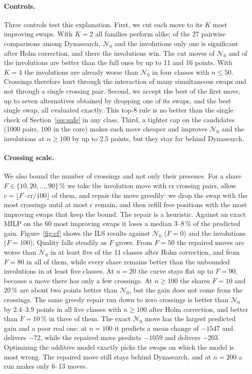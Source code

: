 \documentclass{article}
\newcommand{\N}{\mathcal{N}}
\begin{document}
\paragraph{Controls.} Three controls test this explanation. First, we
cut each move to its $K$ most improving swaps. With $K=2$ all families
perform alike: of the 27 pairwise comparisons among Dynasearch, $\N_0$
and the involutions only one is significant after Holm correction, and
there the involutions win. The cut moves of $\N_0$ and of the
involutions are better than the full ones by up to 11 and 16 points.
With $K=4$ the involutions are already worse than $\N_0$ in four
classes with $n\leq50$. Crossings therefore hurt through the
interaction of many simultaneous swaps and not through a single crossing
pair. Second, we accept the best of the first move, up to seven
alternatives obtained by dropping one of its swaps, and the best single
swap, all evaluated exactly. This top-8 rule is no better than the
single check of Section~\ref{sec:safe} in any class. Third, a tighter cap
on the candidates (1000 pairs, 100 in the core) makes each move cheaper
and improves $\N_0$ and the involutions at $n\geq100$ by up to $2.5$
points, but they stay far behind Dynasearch.

\paragraph{Crossing scale.} We also bound the number of crossings and
not only their presence. For a share $F\in\{10,20,\dots,90\}\,\%$ we take
the involution move with cr crossing pairs, allow
$c=\lfloor F\cdot\mathrm{cr}/100\rfloor$ of them, and repair the move
greedily: we drop the swap with the most crossings until at most $c$
remain, and then refill free positions with the most improving swaps
that keep the bound. The repair is a heuristic. Against an exact MILP on
the 60 most improving swaps it loses a median 3--8\,\% of the predicted
gain. Figure~\ref{fig:cf} shows the ILS results against $\N_0$ ($F=0$)
and the involutions ($F=100$). Quality falls steadily as $F$ grows. From
$F=50$ the repaired moves are worse than $\N_0$ in at least five of the
11 classes after Holm correction, and from $F=80$ in all of them, while
every share remains better than the unbounded involutions in at least
five classes. At $n=20$ the curve stays flat up to $F=90$, because a
move there has only a few crossings. At $n\geq100$ the shares $F=10$ and $20\,\%$ are about two points better
than $\N_0$, but the gain does not come from the crossings. The same
greedy repair run down to zero crossings is better than $\N_0$ by
2.4--3.9 points in all five classes with $n\geq100$ after Holm
correction, and better than $F=10\,\%$ in three of them. The exact $\N_0$
move has the largest predicted gain and a poor real one: at $n=100$ it
predicts a mean change of $-1547$ and delivers $-72$, while the repaired
move predicts $-1059$ and delivers $-203$. Optimizing the additive model
exactly picks the swaps on which the model is most wrong. The repaired
move still stays behind Dynasearch, and at $n=200$ a run makes only
6--13 moves.
\end{document}
